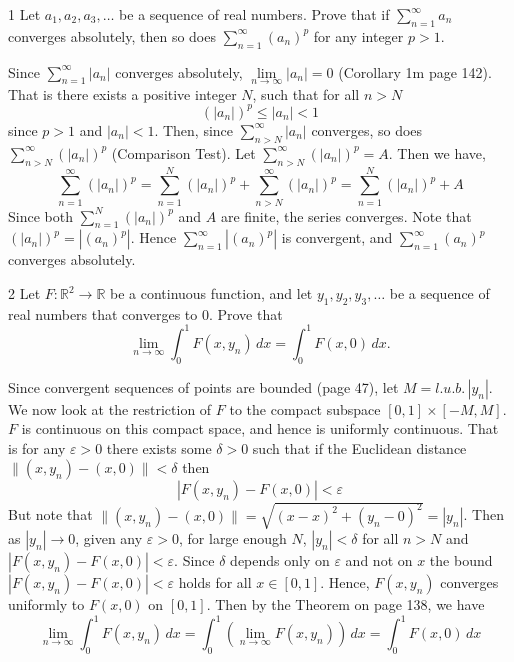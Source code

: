 \documentclass[12pt]{article}
\begin{document}


\begin{problem}{1}
Let $a_1, a_2, a_3, \ldots$ be a sequence of real numbers. Prove that if $\sum_{n=1}^{\infty} a_n$ converges absolutely, then so does $\sum_{n=1}^{\infty} (a_n)^p$ for any integer $p>1$.
\end{problem}

\begin{solution}
    \bbni

    Since $\sum_{n=1}^\infty |a_n|$ converges absolutely, $\underset{n \to \infty}{\lim}|a_n| = 0$ (Corollary 1m page 142). That is there exists a positive integer $N$, such that for all $n>N$
    \[(|a_n|)^p \leq |a_n| < 1\]
    since $p > 1$ and $|a_n| < 1$. 
    Then, since $\sum_{n>N}^\infty |a_n|$ converges, so does $\sum_{n>N}^\infty (|a_n|)^p$ (Comparison Test). Let $\sum_{n>N}^\infty (|a_n|)^p = A$. Then we have, 
    \[\sum_{n=1}^\infty (|a_n|)^p = \sum_{n=1}^{N} (|a_n|)^p + \sum_{n>N}^\infty (|a_n|)^p = \sum_{n=1}^{N} (|a_n|)^p + A\]
    Since both $\sum_{n=1}^N (|a_n|)^p$ and $A$ are finite, the series converges. Note that $(|a_n|)^p = |(a_n)^p|$. Hence $\sum_{n=1}^\infty |(a_n)^p|$ is convergent, and $\sum_{n=1}^\infty (a_n)^p$ converges absolutely.

\end{solution}

\newpage

\begin{problem}{2}
    Let $F:\mathbb{R}^2 \to \mathbb{R}$ be a continuous function, and let $y_1,y_2,y_3,\ldots$ be a sequence of real numbers that converges to $0$. Prove that
    \[ \lim_{n\to\infty}\int_{0}^{1} F(x,y_n)\,dx = \int_{0}^{1} F(x,0)\,dx . \]
\end{problem}

\begin{solution}
    \bbni

    Since convergent sequences of points are bounded (page 47), let $M = l.u.b.\,{|y_n|}$. We now look at the restriction of $F$ to the compact subspace $[0,1] \times [-M, M]$. $F$ is continuous on this compact space, and hence is uniformly continuous. That is for any $\varepsilon > 0$ there exists some $\delta > 0$ such that if the Euclidean distance $\|(x, y_n) -(x,0)\| < \delta$ then 
    \[|F(x, y_n) - F(x, 0)| < \varepsilon\]
    But note that $\|(x, y_n) -(x,0)\| = \sqrt{(x-x)^2 + (y_n-0)^2} = |y_n|$. Then as $|y_n| \to 0$, given any $\varepsilon >0$, for large enough $N$,
    $|y_n| < \delta$ for all $n > N$ and $|F(x, y_n) - F(x, 0)| < \varepsilon$. Since $\delta$ depends only on $\varepsilon$ and not on $x$ the bound $|F(x, y_n) - F(x, 0)| < \varepsilon$ holds for all $x \in [0,1]$. Hence, $F(x,y_n)$ converges uniformly to $F(x, 0)$ on $[0,1]$. Then by the Theorem on page 138, we have 
    \[ \lim_{n\to\infty}\int_{0}^{1} F(x,y_n)\,dx = \int_{0}^{1} \left(\lim_{n\to \infty} F(x,y_n)\right)\,dx = \int_{0}^{1} F(x,0)\,dx  \]
\end{solution}
\end{document}
